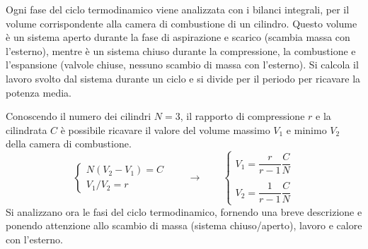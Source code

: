 
%
\sol

\partone
Ogni fase del ciclo termodinamico viene analizzata con i bilanci integrali, per il volume corrispondente alla camera di combustione di un cilindro. Questo volume è un sistema aperto durante la fase di aspirazione e scarico (scambia massa con l'esterno), mentre è un sistema chiuso durante la compressione, la combustione e l'espansione (valvole chiuse, nessuno scambio di massa con l'esterno). Si calcola il lavoro svolto dal sistema durante un ciclo e si divide per il periodo per ricavare la potenza media. 

\parttwo
Conoscendo il numero dei cilindri $N=3$, il rapporto di compressione $r$ e la cilindrata $C$ è possibile ricavare il valore del volume massimo $V_1$ e minimo $V_2$ della camera di combustione.
\begin{equation}
\begin{cases}
 N( V_2 - V_1 ) = C \\
 V_1 / V_2 = r
\end{cases} \qquad \rightarrow \qquad
\begin{cases}
 V_1 = \dfrac{r}{r-1} \dfrac{C}{N} \\ \\ 
 V_2 = \dfrac{1}{r-1} \dfrac{C}{N}
\end{cases} 
\end{equation}
Si analizzano ora le fasi del ciclo termodinamico, fornendo una breve descrizione e ponendo attenzione allo scambio di massa (sistema chiuso/aperto), lavoro e calore con l'esterno.
